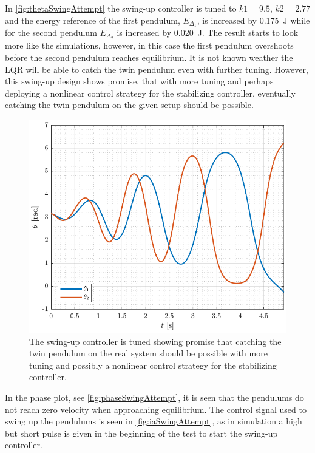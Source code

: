 %
%
%
In \autoref{fig:thetaSwingAttempt} the swing-up controller is tuned to $k1 = 9.5$, $k2 = 2.77$ and the energy reference of the first pendulum, $E_{\Delta_1}$, is increased by \SI{0.175}{J} while for the second pendulum $E_{\Delta_2}$ is increased by \SI{0.020}{J}. The result starts to look more like the simulations, however, in this case the first pendulum overshoots before the second pendulum reaches equilibrium. It is not known weather the LQR will be able to catch the twin pendulum even with further tuning. However, this swing-up design shows promise, that with more tuning and perhaps deploying a nonlinear control strategy for the stabilizing controller, eventually catching the twin pendulum on the given setup should be possible.
%
%
%
\begin{figure}[H]
  \includegraphics[width=.5\textwidth]{figures/thetaSwingAttempt}
  \caption{The swing-up controller is tuned showing promise that catching the twin pendulum on the real system should be possible with more tuning and possibly a nonlinear control strategy for the stabilizing controller.}
  \label{fig:thetaSwingAttempt}
\end{figure}
%
In the phase plot, see \autoref{fig:phaseSwingAttempt}, it is seen that the pendulums do not reach zero velocity when approaching equilibrium. The control signal used to swing up the pendulums is seen in \autoref{fig:iaSwingAttempt}, as in simulation a high but short pulse is given in the beginning of the test to start the swing-up controller.
%
